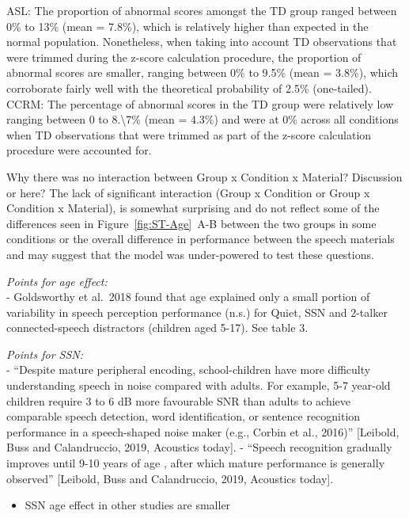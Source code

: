 \documentclass[a4paper, twoside]{templates/ociamthesis}
\providecommand{\tightlist}{%
  \setlength{\itemsep}{0pt}\setlength{\parskip}{0pt}}
\begin{document}
ASL:
The proportion of abnormal scores amongst the TD group ranged between 0\% to 13\% (mean = 7.8\%), which is relatively higher than expected in the normal population. Nonetheless, when taking into account TD observations that were trimmed during the z-score calculation procedure, the proportion of abnormal scores are smaller, ranging between 0\% to 9.5\% (mean = 3.8\%), which corroborate fairly well with the theoretical probability of 2.5\% (one-tailed).\\

CCRM:
The percentage of abnormal scores in the TD group were relatively low ranging between 0 to 8.\textbackslash7\% (mean = 4.3\%) and were at 0\% across all conditions when TD observations that were trimmed as part of the z-score calculation procedure were accounted for.

Why there was no interaction between Group x Condition x Material?
\colorbox[HTML]{CCCCFF}{Discussion or here?} The lack of significant interaction (Group x Condition or Group x Condition x Material), is somewhat surprising and do not reflect some of the differences seen in Figure~\ref{fig:ST-Age}~A-B between the two groups in some conditions or the overall difference in performance between the speech materials and may suggest that the model was under-powered to test these questions.

\emph{Points for age effect:}\\
- Goldsworthy et al.~2018 found that age explained only a small portion of variability in speech perception performance (n.s.) for Quiet, SSN and 2-talker connected-speech distractors (children aged 5-17). See table 3.

\emph{Points for SSN:}\\
- ``Despite mature peripheral encoding, school-children have more difficulty understanding speech in noise compared with adults. For example, 5-7 year-old children require 3 to 6 dB more favourable SNR than adults to achieve comparable speech detection, word identification, or sentence recognition performance in a speech-shaped noise maker (e.g., Corbin et al., 2016)'' {[}Leibold, Buss and Calandruccio, 2019, Acoustics today{]}. - ``Speech recognition gradually improves until 9-10 years of age , after which mature performance is generally observed'' {[}Leibold, Buss and Calandruccio, 2019, Acoustics today{]}.

\begin{itemize}
\tightlist
\item
  SSN age effect in other studies are smaller
\end{itemize}
\end{document}
